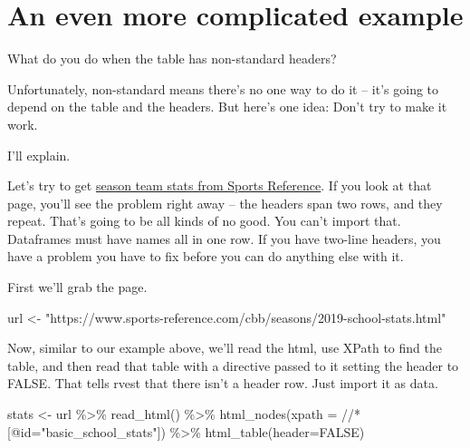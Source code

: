 \documentclass[
]{book}
\newenvironment{Shaded}{\begin{snugshade}}{\end{snugshade}}
\newcommand{\AttributeTok}[1]{\textcolor[rgb]{0.77,0.63,0.00}{#1}}
\newcommand{\ConstantTok}[1]{\textcolor[rgb]{0.00,0.00,0.00}{#1}}
\newcommand{\FunctionTok}[1]{\textcolor[rgb]{0.00,0.00,0.00}{#1}}
\newcommand{\NormalTok}[1]{#1}
\newcommand{\OtherTok}[1]{\textcolor[rgb]{0.56,0.35,0.01}{#1}}
\newcommand{\SpecialCharTok}[1]{\textcolor[rgb]{0.00,0.00,0.00}{#1}}
\newcommand{\StringTok}[1]{\textcolor[rgb]{0.31,0.60,0.02}{#1}}
\begin{document}
\hypertarget{an-even-more-complicated-example}{%
\section{An even more complicated example}\label{an-even-more-complicated-example}}

What do you do when the table has non-standard headers?

Unfortunately, non-standard means there's no one way to do it -- it's going to depend on the table and the headers. But here's one idea: Don't try to make it work.

I'll explain.

Let's try to get \href{https://www.sports-reference.com/cbb/seasons/2019-school-stats.html}{season team stats from Sports Reference}. If you look at that page, you'll see the problem right away -- the headers span two rows, and they repeat. That's going to be all kinds of no good. You can't import that. Dataframes must have names all in one row. If you have two-line headers, you have a problem you have to fix before you can do anything else with it.

First we'll grab the page.

\begin{Shaded}
\begin{Highlighting}[]
\NormalTok{url }\OtherTok{\textless{}{-}} \StringTok{"https://www.sports{-}reference.com/cbb/seasons/2019{-}school{-}stats.html"}
\end{Highlighting}
\end{Shaded}

Now, similar to our example above, we'll read the html, use XPath to find the table, and then read that table with a directive passed to it setting the header to FALSE. That tells rvest that there isn't a header row. Just import it as data.

\begin{Shaded}
\begin{Highlighting}[]
\NormalTok{stats }\OtherTok{\textless{}{-}}\NormalTok{ url }\SpecialCharTok{\%\textgreater{}\%}
  \FunctionTok{read\_html}\NormalTok{() }\SpecialCharTok{\%\textgreater{}\%}
  \FunctionTok{html\_nodes}\NormalTok{(}\AttributeTok{xpath =} \StringTok{\textquotesingle{}//*[@id="basic\_school\_stats"]\textquotesingle{}}\NormalTok{) }\SpecialCharTok{\%\textgreater{}\%}
  \FunctionTok{html\_table}\NormalTok{(}\AttributeTok{header=}\ConstantTok{FALSE}\NormalTok{)}
\end{Highlighting}
\end{Shaded}
\end{document}
